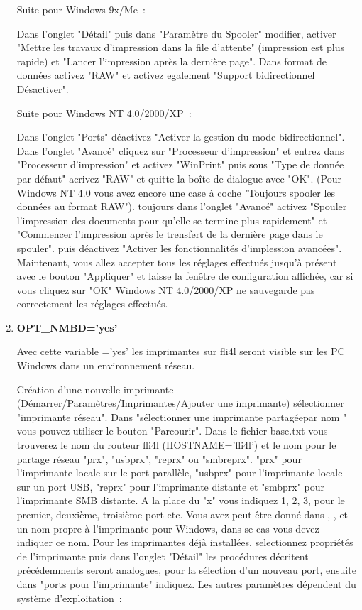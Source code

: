 \begin{enumerate}
    Suite pour Windows 9x/Me~:

     Dans l'onglet "Détail" puis dans "Paramètre du Spooler" modifier, activer
     "Mettre les travaux d'impression dans la file d'attente" (impression est
     plus rapide) et "Lancer l'impression après la dernière page". Dans format
     de données activez "RAW" et activez egalement "Support bidirectionnel
     Désactiver".

    Suite pour Windows NT 4.0/2000/XP~:

    Dans l'onglet "Ports" déactivez "Activer la gestion du mode bidirectionnel".
    Dans l'onglet "Avancé" cliquez sur "Processeur d'impression" et entrez dans
    "Processeur d'impression" et activez "WinPrint" puis sous "Type de donnée par
    défaut" acrivez "RAW" et quitte la boîte de dialogue avec "OK". (Pour Windows
    NT 4.0 vous avez encore une case à coche "Toujours spooler les données au
    format RAW"). toujours dans l'onglet "Avancé" activez "Spouler l'impression
    des documents pour qu'elle se termine plus rapidement" et "Commencer l'impression
    après le trensfert de la dernière page dans le spouler". puis déactivez "Activer
    les fonctionnalités d'implession avancées". Maintenant, vous allez accepter
    tous les réglages effectués jusqu'à présent avec le bouton "Appliquer" et
    laisse la fenêtre de configuration affichée, car si vous cliquez sur "OK"
    Windows NT 4.0/2000/XP ne sauvegarde pas correctement les réglages effectués.

\item \textbf{OPT\_NMBD='yes'}

    Avec cette variable ='yes' les
    imprimantes sur fli4l seront visible sur les PC Windows dans un environnement
    réseau.

    Création d'une nouvelle imprimante (Démarrer/Paramètres/Imprimantes/Ajouter
    une imprimante) sélectionner "imprimante réseau". Dans "sélectionner une
    imprimante partagéepar nom " vous pouvez utiliser le bouton "Parcourir". Dans
    le fichier base.txt vous trouverez le nom du routeur fli4l (HOSTNAME='fli4l')
    et le nom pour le partage réseau "prx", "usbprx", "reprx" ou "smbreprx".
    "prx" pour l'imprimante locale sur le port parallèle, "usbprx" pour l'imprimante
    locale sur un port USB, "reprx" pour l'imprimante distante et "smbprx" pour
    l'imprimante SMB distante. A la place du "x" vous indiquez 1, 2, 3, pour le
    premier, deuxième, troisième port etc. Vous avez peut être donné dans
    , ,
     et 
    un nom propre à l'imprimante pour Windows, dans se cas vous devez indiquer ce nom.
    Pour les imprimantes déjà installées, selectionnez propriétés de l'imprimante
    puis dans l'onglet "Détail" les procédures décritent précédemments seront
    analogues, pour la sélection d'un nouveau port, ensuite dans "ports pour
    l'imprimante" indiquez. Les autres paramètres dépendent du système
    d'exploitation~:


\end{enumerate}
